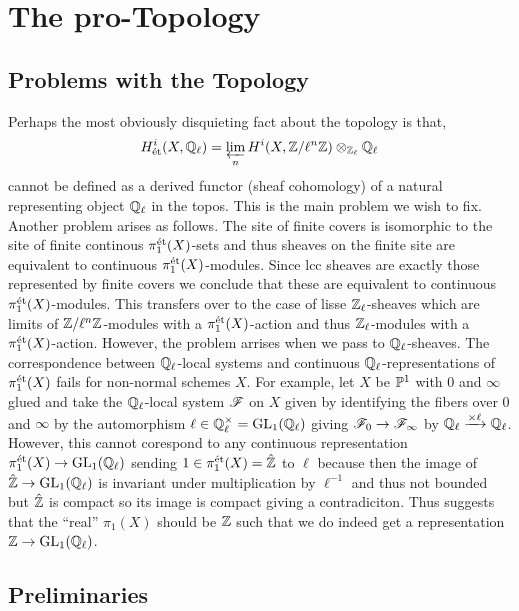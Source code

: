 \documentclass[12pt]{article}
\begin{document}
\section{The pro-\etale Topology}

\subsection{Problems with the \etale Topology}

Perhaps the most obviously disquieting fact about the \etale topology is that,
\[ H_{\et}^i(X, \Q_\ell) = \varprojlim_{n} H^i(X, \Z / \ell^n \Z) \otimes_{\Z_\ell} \Q_\ell \]
cannot be defined as a derived functor (sheaf cohomology) of a natural representing object $\Q_\ell$ in the \etale topos. This is the main problem we wish to fix.
\bigskip\\
Another problem arises as follows. The site of finite \etale covers is isomorphic to the site of finite continous $\pi_1^{\et}(X)$-sets and thus sheaves on the finite \etale site are equivalent to continuous $\pi_1^{\et}(X)$-modules. Since lcc sheaves are exactly those represented by finite \etale covers we conclude that these are equivalent to continuous $\pi_1^{\et}(X)$-modules. This transfers over to the case of lisse $\Z_\ell$-sheaves which are limits of $\Z/\ell^n\Z$-modules with a $\pi_1^{\et}(X)$-action and thus $\Z_\ell$-modules with a $\pi_1^{\et}(X)$-action. However, the problem arrises when we pass to $\Q_\ell$-sheaves. The correspondence between $\Q_\ell$-local systems and continuous $\Q_\ell$-representations of $\pi_1^{\et}(X)$ fails for non-normal schemes $X$. For example, let $X$ be $\P^1$ with $0$ and $\infty$ glued and take the $\Q_\ell$-local system $\F$ on $X$ given by identifying the fibers over $0$ and $\infty$ by the automorphism $\ell \in \Q_\ell^\times = \GL{1}{\Q_\ell}$ giving $\F_0 \to \F_{\infty}$ by $\Q_\ell \xrightarrow{\times \ell} \Q_\ell$. However, this cannot corespond to any continuous representation $\pi_1^{\et}(X) \to \GL{1}{\Q_\ell}$ sending $1 \in \pi_1^{\et}(X) = \hat{\Z}$ to $\ell$ because then the image of $\hat{\Z} \to \GL{1}{\Q_\ell}$ is invariant under multiplication by $\ell^{-1}$ and thus not bounded but $\hat{\Z}$ is compact so its image is compact giving a contradiciton. Thus suggests that the ``real'' $\pi_1(X)$ should be $\Z$ such that we do indeed get a representation $\Z \to \GL{1}{\Q_\ell}$.

\subsection{Preliminaries}
\end{document}
